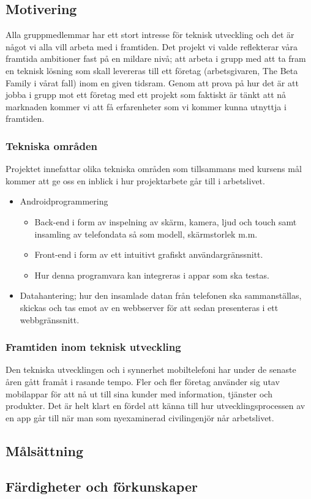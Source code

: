 \subsection{Motivering}
Alla gruppmedlemmar har ett stort intresse för teknisk utveckling och det är något vi alla vill arbeta med i framtiden. Det projekt vi valde reflekterar våra framtida ambitioner fast på en mildare nivå; att arbeta i grupp med att ta fram en teknisk lösning som skall levereras till ett företag (arbetsgivaren, The Beta Family i vårat fall) inom en given tidsram. Genom att prova på hur det är att jobba i grupp mot ett företag med ett projekt som faktiskt är tänkt att nå marknaden kommer vi att få erfarenheter som vi kommer kunna utnyttja i framtiden.

\subsubsection{Tekniska områden}

Projektet innefattar olika tekniska områden som tillsammans med kursens mål kommer att ge oss en inblick i hur projektarbete går till i arbetslivet. 
\begin{itemize}
	\item Androidprogrammering
	\begin{itemize}
		\item Back-end i form av inspelning av skärm, kamera, ljud och touch samt insamling av telefondata så som modell, skärmstorlek m.m.
		\item Front-end i form av ett intuitivt grafiskt användargränssnitt.
		\item Hur denna programvara kan integreras i appar som ska testas.
	\end{itemize}
	\item Datahantering; hur den insamlade datan från telefonen ska sammanställas, skickas och tas emot av en webbserver för att sedan presenteras i ett webbgränssnitt.
\end{itemize}

\subsubsection{Framtiden inom teknisk utveckling}
Den tekniska utvecklingen och i synnerhet mobiltelefoni har under de senaste åren gått framåt i rasande tempo. Fler och fler företag använder sig utav mobilappar för att nå ut till sina kunder med information, tjänster och produkter. Det är helt klart en fördel att känna till hur utvecklingsprocessen av en app går till när man som nyexaminerad civilingenjör når arbetslivet.

\subsection{Målsättning}
\subsection{Färdigheter och förkunskaper}

